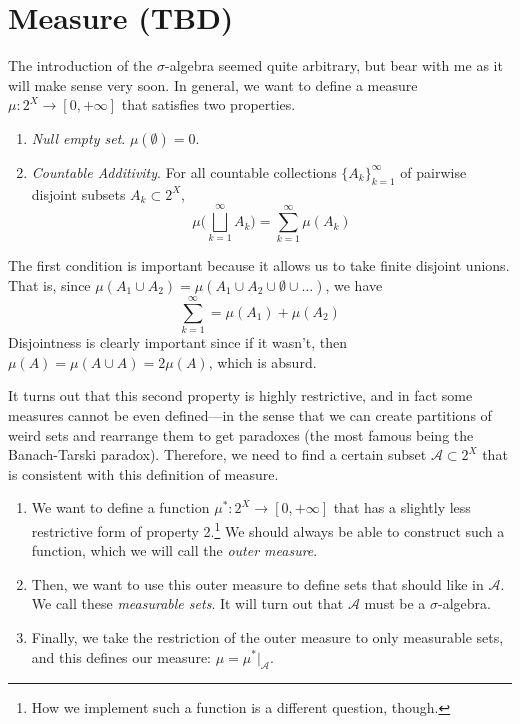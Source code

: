 \section{Measure (TBD)}

  The introduction of the $\sigma$-algebra seemed quite arbitrary, but bear with me as it will make sense very soon. In general, we want to define a measure $\mu: 2^X \to [0, +\infty]$ that satisfies two properties. 
  \begin{enumerate}
    \item \textit{Null empty set}. $\mu(\emptyset) = 0$. 
    \item \textit{Countable Additivity}. For all countable collections $\{A_k\}_{k=1}^\infty$ of pairwise disjoint subsets $A_k \subset 2^{X}$, 
    \begin{equation}
      \mu \bigg( \bigsqcup_{k=1}^\infty A_k \bigg) = \sum_{k=1}^\infty \mu(A_k)
    \end{equation}
  \end{enumerate} 

  The first condition is important because it allows us to take finite disjoint unions. That is, since $\mu(A_1 \cup A_2) = \mu(A_1 \cup A_2 \cup \emptyset \cup \ldots)$, we have 
  \begin{equation}
    \sum_{k=1}^\infty = \mu(A_1) + \mu(A_2)
  \end{equation}
  Disjointness is clearly important since if it wasn't, then $\mu(A) = \mu(A \cup A) = 2 \mu(A)$, which is absurd. 

  It turns out that this second property is highly restrictive, and in fact some measures cannot be even defined---in the sense that we can create partitions of weird sets and rearrange them to get paradoxes (the most famous being the Banach-Tarski paradox). Therefore, we need to find a certain subset $\mathcal{A} \subset 2^X$ that is consistent with this definition of measure. 
  
  \begin{enumerate}
    \item We want to define a function $\mu^\ast: 2^X \to [0, +\infty]$ that has a slightly less restrictive form of property 2.\footnote{How we implement such a function is a different question, though.} We should always be able to construct such a function, which we will call the \textit{outer measure}. 

    \item Then, we want to use this outer measure to define sets that should like in $\mathcal{A}$. We call these \textit{measurable sets}. It will turn out that $\mathcal{A}$ must be a $\sigma$-algebra. 

    \item Finally, we take the restriction of the outer measure to only measurable sets, and this defines our measure: $\mu = \mu^\ast \big|_{\mathcal{A}}$.  
  \end{enumerate}

